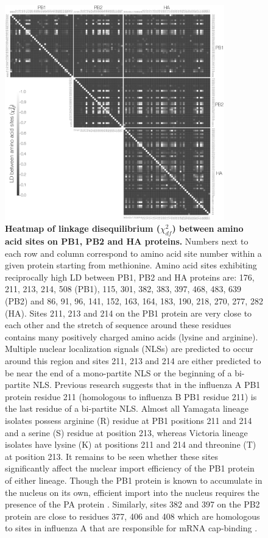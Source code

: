 \documentclass[11pt,oneside,letterpaper]{article}
\newcommand{\chiSq}{\chi^{2}_{df}}
\begin{document}
\begin{figure}
\centering  
\includegraphics[width=0.85\textwidth]  {supp_figures/aaChi_PB1_PB2_HA.png}
\caption{\textbf{Heatmap of linkage disequilibrium ($\chiSq$) between amino acid sites on PB1, PB2 and HA proteins.}
Numbers next to each row and column correspond to amino acid site number within a given protein starting from methionine.
Amino acid sites exhibiting reciprocally high LD between PB1, PB2 and HA proteins are: 176, 211, 213, 214, 508 (PB1), 115, 301, 382, 383, 397, 468, 483, 639 (PB2) and 86, 91, 96, 141, 152, 163, 164, 183, 190, 218, 270, 277, 282 (HA).
Sites 211, 213 and 214 on the PB1 protein are very close to each other and the stretch of sequence around these residues contains many positively charged amino acids (lysine and arginine).
Multiple nuclear localization signals (NLSs) are predicted to occur around this region and sites 211, 213 and 214 are either predicted to be near the end of a mono-partite NLS or the beginning of a bi-partite NLS.
Previous research \citep{nath1990} suggests that in the influenza A PB1 protein residue 211 (homologous to influenza B PB1 residue 211) is the last residue of a bi-partite NLS.
Almost all Yamagata lineage isolates possess arginine (R) residue at PB1 positions 211 and 214 and a serine (S) residue at position 213, whereas Victoria lineage isolates have lysine (K) at positions 211 and 214 and threonine (T) at position 213.
It remains to be seen whether these sites significantly affect the nuclear import efficiency of the PB1 protein of either lineage.
Though the PB1 protein is known to accumulate in the nucleus on its own, efficient import into the nucleus requires the presence of the PA protein \citep{fodor2004}.
Similarly, sites 382 and 397 on the PB2 protein are close to residues 377, 406 and 408 which are homologous to sites in influenza A that are responsible for mRNA cap-binding \citep{guilligay2008}.}
\label{ChiCore}
\end{figure}
\end{document}
